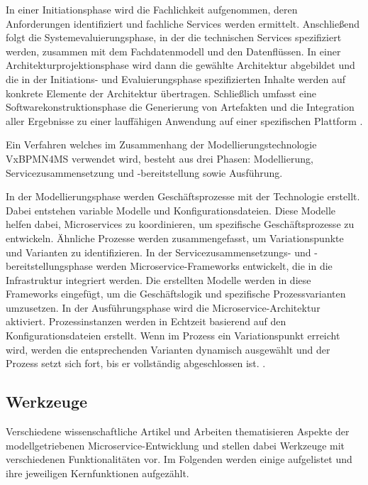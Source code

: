 {In einer Initiationsphase wird die Fachlichkeit aufgenommen, deren Anforderungen identifiziert und fachliche Services werden ermittelt. Anschließend folgt die Systemevaluierungsphase, in der die technischen Services spezifiziert werden, zusammen mit dem Fachdatenmodell und den Datenflüssen. In einer Architekturprojektionsphase wird dann die gewählte Architektur abgebildet und die in der Initiations- und Evaluierungsphase spezifizierten Inhalte werden auf konkrete Elemente der Architektur übertragen. Schließlich umfasst eine Softwarekonstruktionsphase die Generierung von Artefakten und die Integration aller Ergebnisse zu einer lauffähigen Anwendung auf einer spezifischen Plattform \cite[S.62-66]{rempp}.

Ein Verfahren welches im Zusammenhang der Modellierungstechnologie VxBPMN4MS verwendet wird, besteht aus drei Phasen: Modellierung, Servicezusammensetzung und -bereitstellung sowie Ausführung.

In der Modellierungsphase werden Geschäftsprozesse mit der Technologie erstellt. Dabei entstehen variable Modelle und Konfigurationsdateien. Diese Modelle helfen dabei, Microservices zu koordinieren, um spezifische Geschäftsprozesse zu entwickeln. Ähnliche Prozesse werden zusammengefasst, um Variationspunkte und Varianten zu identifizieren. In der Servicezusammensetzungs- und -bereitstellungsphase werden Microservice-Frameworks entwickelt, die in die Infrastruktur integriert werden. Die erstellten Modelle werden in diese Frameworks eingefügt, um die Geschäftslogik und spezifische Prozessvarianten umzusetzen. In der Ausführungsphase wird die Microservice-Architektur aktiviert. Prozessinstanzen werden in Echtzeit basierend auf den Konfigurationsdateien erstellt. Wenn im Prozess ein Variationspunkt erreicht wird, werden die entsprechenden Varianten dynamisch ausgewählt und der Prozess setzt sich fort, bis er vollständig abgeschlossen ist. \cite{sun}.

\newpage
\subsection{Werkzeuge}

Verschiedene wissenschaftliche Artikel und Arbeiten thematisieren Aspekte der modellgetriebenen Microservice-Entwicklung und stellen dabei Werkzeuge mit verschiedenen Funktionalitäten vor. Im Folgenden werden einige aufgelistet und ihre jeweiligen Kernfunktionen aufgezählt.

}
